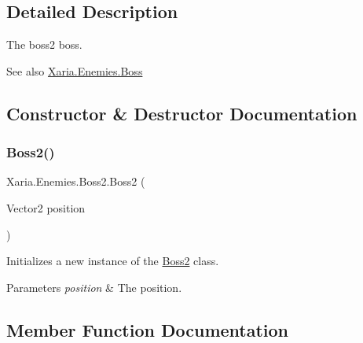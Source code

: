 \subsection{Detailed Description}
The boss2 boss. 

\begin{DoxySeeAlso}{See also}
\hyperlink{classXaria_1_1Enemies_1_1Boss}{Xaria.\+Enemies.\+Boss}


\end{DoxySeeAlso}


\subsection{Constructor \& Destructor Documentation}
\mbox{\label{classXaria_1_1Enemies_1_1Boss2_a9fa63b6517248b98b0d9363f04516f00}} 
\subsubsection{\texorpdfstring{Boss2()}{Boss2()}}
{\footnotesize\ttfamily Xaria.\+Enemies.\+Boss2.\+Boss2 (\begin{DoxyParamCaption}\item[{Vector2}]{position }\end{DoxyParamCaption})\hspace{0.3cm}{\ttfamily [inline]}}



Initializes a new instance of the \hyperlink{classXaria_1_1Enemies_1_1Boss2}{Boss2} class. 


\begin{DoxyParams}{Parameters}
{\em position} & The position.\\
\hline
\end{DoxyParams}


\subsection{Member Function Documentation}
\mbox{\label{classXaria_1_1Enemies_1_1Boss2_ab1a3c2b68ec14481a3daba180782cce4}} 
